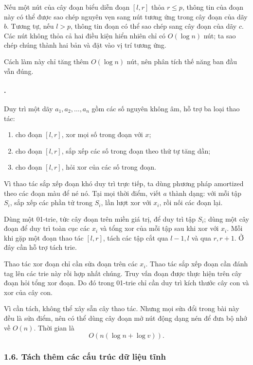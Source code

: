 \documentclass[11pt]{article}
\begin{document}
Nếu một nút của cây đoạn biểu diễn đoạn \([l,r]\) thỏa \(r\le p\), thông tin
của đoạn này có thể được sao chép nguyên vẹn sang nút tương ứng trong cây đoạn
của dãy \(b\). Tương tự, nếu \(l>p\), thông tin đoạn có thể sao chép sang cây
đoạn của dãy \(c\). Các nút không thỏa cả hai điều kiện hiển nhiên chỉ có
\(O(\log n)\) nút; ta sao chép chúng thành hai bản và đặt vào vị trí tương ứng.

Cách làm này chỉ tăng thêm \(O(\log n)\) nút, nên phân tích thế năng ban đầu
vẫn đúng.

\paragraph{.}
Duy trì một dãy \(a_1,a_2,\ldots,a_n\) gồm các số nguyên không âm, hỗ trợ ba
loại thao tác:
\begin{enumerate}
  \item cho đoạn \([l,r]\), xor mọi số trong đoạn với \(x\);
  \item cho đoạn \([l,r]\), sắp xếp các số trong đoạn theo thứ tự tăng dần;
  \item cho đoạn \([l,r]\), hỏi xor của các số trong đoạn.
\end{enumerate}

Vì thao tác sắp xếp đoạn khó duy trì trực tiếp, ta dùng phương pháp amortized
theo các đoạn màu để né nó. Tại mọi thời điểm, viết \(a\) thành dạng: với mỗi
tập \(S_i\), sắp xếp các phần tử trong \(S_i\), lần lượt xor với \(x_i\), rồi
nối các đoạn lại.

Dùng một 01-trie, tức cây đoạn trên miền giá trị, để duy trì tập \(S_i\); dùng
một cây đoạn để duy trì toàn cục các \(x_i\) và tổng xor của mỗi tập sau khi xor
với \(x_i\). Mỗi khi gặp một đoạn thao tác \([l,r]\), tách các tập cắt qua
\(l-1,l\) và qua \(r,r+1\). Ở đây cần hỗ trợ tách trie.

Thao tác xor đoạn chỉ cần sửa đoạn trên các \(x_i\). Thao tác sắp xếp đoạn cần
đánh tag lên các trie này rồi hợp nhất chúng. Truy vấn đoạn được thực hiện trên
cây đoạn hỏi tổng xor đoạn. Do đó trong 01-trie chỉ cần duy trì kích thước cây
con và xor của cây con.

Vì cần tách, không thể xây sẵn cây thao tác. Nhưng mọi sửa đổi trong bài này
đều là sửa điểm, nên có thể dùng cây đoạn mở nút động dạng nén để đưa bộ nhớ
về \(O(n)\). Thời gian là
\[
  O(n(\log n+\log v)).
\]

\subsubsection*{1.6. Tách thêm các cấu trúc dữ liệu tĩnh}
\end{document}
